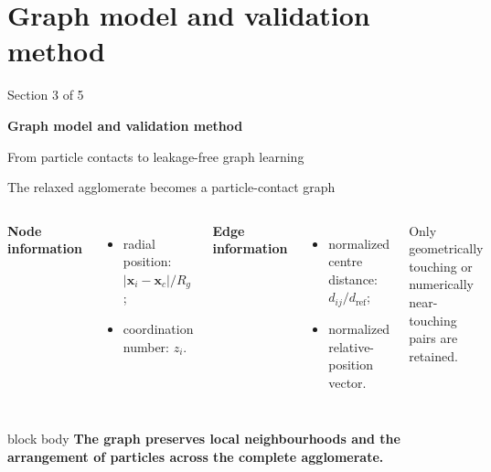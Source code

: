 \documentclass[aspectratio=169,11pt]{beamer}
\newcommand{\hi}[1]{\textcolor{tumblue}{\textbf{#1}}}
\newcommand{\takeaway}[1]{%
	\begin{beamercolorbox}[rounded=true,sep=.55em]{block body}
		\centering\color{tumdark}\textbf{#1}
\end{beamercolorbox}}
\begin{document}
\section[Graph method]{Graph model and validation method}
\begin{frame}{}
  \vfill
  {\large\color{tumgray}Section 3 of 5}\par\vspace{0.4cm}
  {\LARGE\color{tumblue}\textbf{Graph model and validation method}}\par\vspace{0.5cm}
  {\large From particle contacts to leakage-free graph learning}
  \vfill
\end{frame}

\begin{frame}{The relaxed agglomerate becomes a particle-contact graph}
  \begin{columns}[c,onlytextwidth]
    \centering
      \hi{Node information}
      \begin{itemize}
        \item radial position: $|\boldsymbol{x}_i-\boldsymbol{x}_c|/R_g$;
        \item coordination number: $z_i$.
      \end{itemize}
      \hi{Edge information}
      \begin{itemize}
        \item normalized centre distance: $d_{ij}/d_{\mathrm{ref}}$;
        \item normalized relative-position vector.
      \end{itemize}
      \small Only geometrically touching or numerically near-touching pairs are retained.
  \end{columns}
  \vspace{.15cm}
  \takeaway{The graph preserves local neighbourhoods and the arrangement of particles across the complete agglomerate.}
\end{frame}
\end{document}
